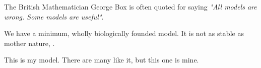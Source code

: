 The British Mathematician George Box is often quoted for saying \textit{"All models are wrong. Some models are useful"}. 

We have a minimum, wholly biologically founded model. It is not as stable as mother nature, .

This is my model. There are many like it, but this one is mine.